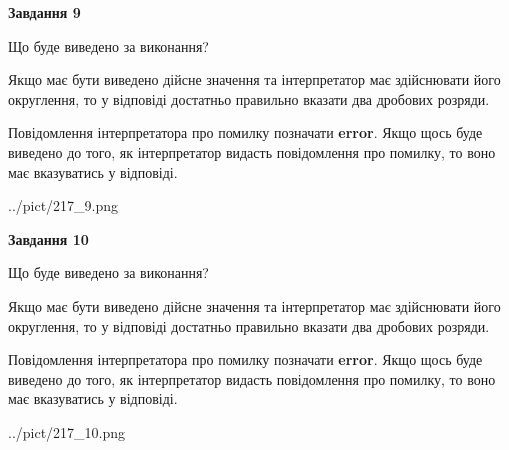 \documentclass[12pt, ukrainian]{article}
\begin{document}
{\begin {Large}
{\begin {center}\textbf{Завдання 9}\end {center}}\par
Що буде виведено за виконання? \par

Якщо має бути виведено дійсне значення та інтерпретатор має здійснювати його округлення, 
то у відповіді достатньо правильно вказати два дробових розряди.

Повідомлення інтерпретатора про помилку позначати \textbf{error}.
Якщо щось буде виведено до того, як інтерпретатор видасть повідомлення про помилку, 
то воно має вказуватись у відповіді. \par

\begin{center}
	{../pict/217_9.png}
\end{center}
\newpage

{\begin {center}\textbf{Завдання 10}\end {center}}\par
Що буде виведено за виконання? \par

Якщо має бути виведено дійсне значення та інтерпретатор має здійснювати його округлення, 
то у відповіді достатньо правильно вказати два дробових розряди.

Повідомлення інтерпретатора про помилку позначати \textbf{error}.
Якщо щось буде виведено до того, як інтерпретатор видасть повідомлення про помилку, 
то воно має вказуватись у відповіді. \par

\begin{center}
	{../pict/217_10.png}
\end{center}
\newpage

\end {Large}}
\end{document}
